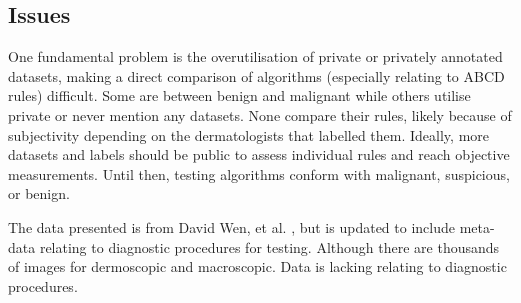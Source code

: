 \subsection{Issues}
One fundamental problem is the overutilisation of private or privately annotated datasets, making a direct comparison of algorithms (especially relating to ABCD rules) difficult. Some are between benign and malignant\cite{Meskini2018, Kasmi2016, Ali2020b, Ali2020a} while others utilise private or never mention any datasets\cite{Kasmi2016, She2007, Tenenhaus2010, Ramezani2014, Zaqout2016}. None compare their rules, likely because of subjectivity depending on the dermatologists that labelled them. Ideally, more datasets and labels should be public to assess individual rules and reach objective measurements. Until then, testing algorithms conform with malignant, suspicious, or benign.


The data presented is from David Wen, et al. \cite{Wen2022}, but is updated to include meta-data relating to diagnostic procedures for testing. Although there are thousands of images for dermoscopic and macroscopic. Data is lacking relating to diagnostic procedures.